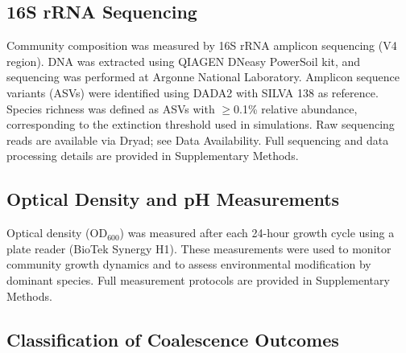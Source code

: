 \subsection*{16S rRNA Sequencing}
\label{sec:methods:sequencing}

Community composition was measured by 16S rRNA amplicon sequencing (V4 region). DNA was extracted using QIAGEN DNeasy PowerSoil kit, and sequencing was performed at Argonne National Laboratory. Amplicon sequence variants (ASVs) were identified using DADA2\citep{Callahan2016} with SILVA 138\citep{Quast2013} as reference.  Species richness was defined as ASVs with $\geq$0.1\% relative abundance, corresponding to the extinction threshold used in simulations. Raw sequencing reads are available via Dryad; see Data Availability. Full sequencing and data processing details are provided in Supplementary Methods.


\subsection*{Optical Density and pH Measurements}
\label{sec:methods:od_ph}

Optical density (OD$_{600}$) was measured after each 24-hour growth cycle using a plate reader (BioTek Synergy H1).  These measurements were used to monitor community growth dynamics and to assess environmental modification by dominant species. Full measurement protocols are provided in Supplementary Methods.


\subsection*{Classification of Coalescence Outcomes}
\label{sec:methods:classification}

